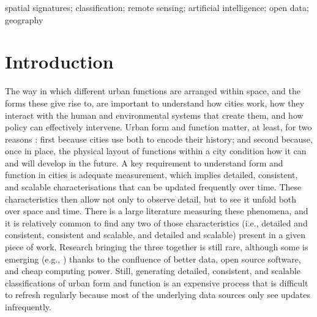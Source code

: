 \documentclass[]{interact}
\theoremstyle{plain}%
\theoremstyle{definition}
\theoremstyle{remark}
\begin{document}
\begin{keywords}
spatial signatures; classification; remote sensing; artificial intelligence; open data; geography
\end{keywords}


\section{Introduction}
\label{sec:intro} %

The way in which different urban functions are arranged within space, and the forms these
give rise to, are important to understand how cities work, how they
interact with the human and environmental systems that create them, and how
policy can effectively intervene.
Urban form and function matter, at least, for two reasons \citep{dab_mf_2021a}:
first because cities use both to encode their history; and second because,
once in place, the physical layout of functions within a city condition how it
can and will develop in the future.
A key requirement to understand form and function in cities is adequate
measurement, which implies detailed, consistent, and scalable
characterisations that can be updated frequently over time. These
characteristics then allow not only to observe detail, but to see it unfold
both over space and time.
There is a large literature measuring these phenomena, and it is relatively
common to find any two of those characteristics (i.e., detailed and consistent,
consistent and scalable, and detailed and scalable) present in a given piece
of work.
Research bringing the three together is still rare, although some is
emerging (e.g., \citealp{fleischmann2022geographical}) thanks to the confluence of better data, open
source software, and cheap computing power.
Still, generating detailed, consistent, and scalable classifications of urban
form and function is an expensive process that is difficult to refresh
regularly because most of the underlying data sources only see updates
infrequently.
\end{document}
